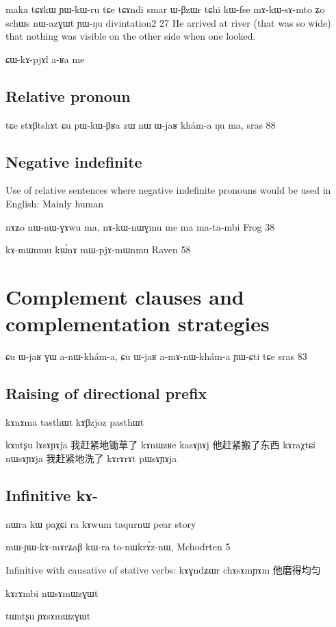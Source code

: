 \documentclass[oldfontcommands,oneside,a4paper,11pt]{memoir}
\begin{document}
maka tɕɤkɯ ɲɯ-kɯ-ru tɕe tɕɤndi smar ɯ-βzɯr tɕhi kɯ-fse mɤ-kɯ-sɤ-mto ʑo schɯs nɯ-azɣɯt ɲɯ-ŋu
divintation2 27
He arrived at river (that was so wide) that nothing was visible on the other side when one looked.

ɕɯ-kɤ-pjɤl a-ʁa me

\section{Relative pronoun}

tɕe stɤβtshɤt ɕu pɯ-kɯ-βʁa zɯ nɯ ɯ-jaʁ khám-a ŋu ma,
sras 88



\section{Negative indefinite}
Use of relative sentences where negative indefinite pronouns would be used in English: 
Mainly human

nɤʑo	nɯ-nɯ-ɣɤwu	ma,	nɤ-kɯ-nɯɣmu	me	ma	ma-ta-mbi
Frog 38
 

	kɤ-mɯnmu	kɯ́nɤ	mɯ-pjɤ-mɯnmu				
	Raven 58
	
	
	
\chapter{Complement clauses and complementation strategies}
ɕu ɯ-jaʁ ɣɯ a-nɯ-khám-a, ɕu ɯ-jaʁ a-mɤ-nɯ-khám-a ɲɯ-ɕti tɕe
sras 83


\section{Raising of directional prefix}
kɤnɤma tasthɯt
kɤβzjoz pasthɯt


kɤntʂu lɤsɤɲɤja
我赶紧地锄草了
 kɤnɯzʁe kasɤɲɤj
 他赶紧搬了东西
 kɤraχtɕi nɯsɤɲɤja
 我赶紧地洗了
kɤrɤrɤt pɯsɤɲɤja
 
\section{Infinitive kɤ-}
nɯra kɯ paχɕi ra kɤwum taqurnɯ
pear story

mɯ-ɲɯ-kɤ-mɤrʑaβ	kɯ-ra	to-nɯkrɤ́z-nɯ,
Mchodrten 5

Infinitive with causative of stative verbs:
kɤɣndʑɯr chɤsɤmɲɤm
 他磨得均匀

kɤrɤmbi nɯsɤmɯzɣɯt

tɯntʂu ɲɤsɤmɯzɣɯt
\end{document}
